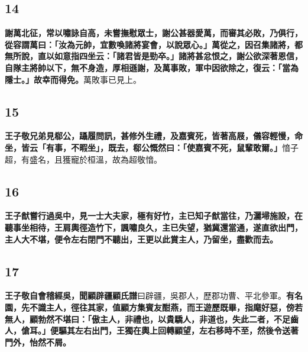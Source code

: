 \subsection*{14}

\textbf{謝萬北征，常以嘯詠自高，未嘗撫慰眾士，謝公甚器愛萬，而審其必敗，乃俱行，從容謂萬曰：「汝為元帥，宜數喚諸將宴會，以說眾心。」萬從之，因召集諸將，都無所說，直以如意指四坐云：「諸君皆是勁卒。」諸將甚忿恨之，謝公欲深著恩信，自隊主將帥以下，無不身造，厚相遜謝，及萬事敗，軍中因欲除之，復云：「當為隱士。」故幸而得免。}{\footnotesize 萬敗事已見上。}

\subsection*{15}

\textbf{王子敬兄弟見郗公，躡履問訊，甚修外生禮，及嘉賓死，皆著高屐，儀容輕慢，命坐，皆云「有事，不暇坐」，既去，郗公慨然曰：「使嘉賓不死，鼠輩敢爾。」}{\footnotesize 愔子超，有盛名，且獲寵於桓溫，故為超敬愔。}

\subsection*{16}

\textbf{王子猷嘗行過吳中，見一士大夫家，極有好竹，主已知子猷當往，乃灑埽施設，在聽事坐相待，王肩輿徑造竹下，諷嘯良久，主已失望，猶冀還當通，遂直欲出門，主人大不堪，便令左右閉門不聽出，王更以此賞主人，乃留坐，盡歡而去。}

\subsection*{17}

\textbf{王子敬自會稽經吳，聞顧辟疆}{\footnotesize \textbf{顧氏譜}曰辟疆，吳郡人，歷郡功曹、平北參軍。}\textbf{有名園，先不識主人，徑往其家，值顧方集賓友酣燕，而王遊歷既畢，指麾好惡，傍若無人，顧勃然不堪曰：「傲主人，非禮也，以貴驕人，非道也，失此二者，不足齒人，傖耳。」便驅其左右出門，王獨在輿上回轉顧望，左右移時不至，然後令送著門外，怡然不屑。}